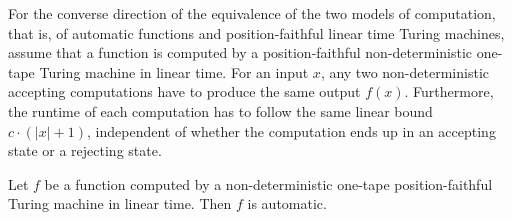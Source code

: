 \documentclass{LMCS}
\theoremstyle{plain}\newtheorem{athm}[thm]{Theorem}
\theoremstyle{plain}\newtheorem{aprop}[thm]{Proposition}
\theoremstyle{plain}\newtheorem{aprob}[thm]{Open Problem}
\theoremstyle{plain}\newtheorem{acor}[thm]{Corollary}
\theoremstyle{plain}\newtheorem{alem}[thm]{Lemma}
\theoremstyle{definition}\newtheorem{adefn}[thm]{Definition}
\theoremstyle{definition}\newtheorem{arem}[thm]{Remark}
\theoremstyle{plain}\newtheorem{aexmp}[thm]{Example}
\theoremstyle{plain}\newtheorem{aclm}[thm]{Claim}
\begin{document}
\noindent
For the converse direction of the equivalence of the two models
of computation, that is, of automatic functions and position-faithful linear
time Turing machines, assume that a function is computed by a position-faithful
non-deterministic one-tape Turing machine in linear time.
For an input $x$, any two non-deterministic
accepting computations have to produce the same output $f(x)$. Furthermore,
the runtime of each computation has to follow the same linear bound
$c \cdot (|x|+1)$, independent of whether the computation ends up in an
accepting state or a rejecting state.

\begin{thm} \label{th:isautomatic}
Let $f$ be a function computed by a non-deterministic one-tape
position-faithful Turing machine in linear time.
Then $f$ is automatic.
\end{thm}
\end{document}
